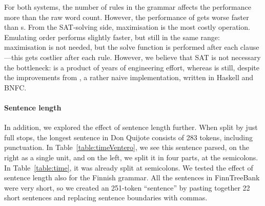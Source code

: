 For both systems, the number of rules in the grammar affects the performance
more than the raw word count.
However, the performance of \satcg{} gets worse faster than s.
From the SAT-solving side, maximisation is the most costly operation.
Emulating order performs slightly faster, but still in the same range:
maximisation is not needed, but the solve function is performed after
each clause---this gets costlier after each rule.
However, we believe that SAT is not necessary the bottleneck:
 is a product of years of engineering effort, whereas \satcg{}
is still, despite the improvements from \citet{listenmaa_claessen2015},
a rather naive implementation, written in Haskell and BNFC.


\paragraph{Sentence length}
In addition, we explored the effect of sentence length further.
When split by just full stops, the longest sentence in Don Quijote consists of 283 tokens, %
including punctuation. In Table~\ref{table:timeVentero}, we see this sentence parsed, on the right as a single unit, and on the left, we split it in four parts, at the semicolons. In Table~\ref{table:time}, it was already split at semicolons.
We tested the effect of sentence length also for the Finnish grammar.
All the sentences in FinnTreeBank were very short, so we created an 251-token ``sentence''
by pasting together 22 short sentences and replacing sentence boundaries with commas.


